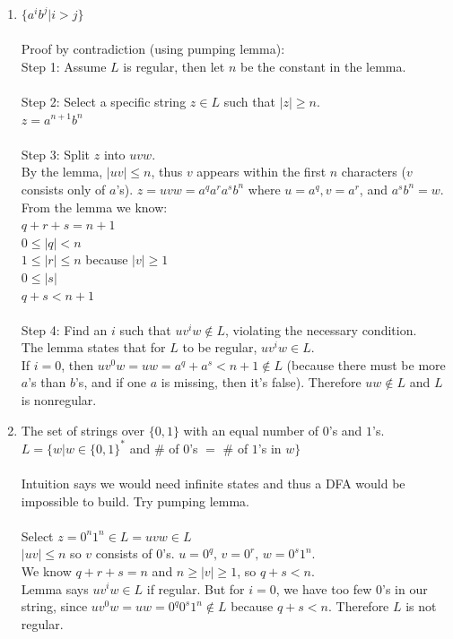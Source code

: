\documentclass[8pt,letterpaper,twocolumn]{article}
\begin{document}
  \begin{enumerate}
  \item $\{a^i b^j | i > j\}$\\
  \\
  Proof by contradiction (using pumping lemma):\\
  Step 1: Assume $L$ is regular, then let $n$ be the constant in the lemma.\\
  \\
  Step 2: Select a specific string $z \in L$ such that $|z| \geq n$.\\
  $z = a^{n+1} b^n$\\
  \\
  Step 3: Split $z$ into $uvw$.\\
  By the lemma, $|uv| \leq n$, thus $v$ appears within the first $n$ characters
  ($v$ consists only of $a$'s).
  $z = uvw = a^q a^r a^s b^n$ where $u = a^q, v = a^r$, and $a^s b^n = w$.\\
  From the lemma we know:\\
  $q+r+s = n+1$\\
  $0 \leq |q| < n$\\
  $1 \leq |r| \leq n$ because $|v| \geq 1$\\
  $0 \leq |s|$\\
  $q+s < n + 1$\\
  \\
  Step 4: Find an $i$ such that $uv^iw \notin L$, violating the necessary condition.\\
  The lemma states that for $L$ to be regular, $uv^iw \in L$.\\
  If $i=0$, then $uv^0w = uw = a^q + a^s < n+1 \notin L$ (because there must be more $a$'s than $b$'s,
  and if one $a$ is missing, then it's false). Therefore $uw \notin L$ and $L$ is nonregular.  
  
  \item The set of strings over $\{0,1\}$ with an equal number of $0$'s and $1$'s.\\
  $L = \{w | w \in \{0,1\}^*$ and \# of $0$'s $=$ \# of $1$'s in $w\}$\\
  \\
  Intuition says we would need infinite states and thus a DFA would be impossible to build.
  Try pumping lemma.\\
  \\
  Select $z = 0^n 1^n \in L = uvw \in L$\\
  $|uv| \leq n$ so $v$ consists of $0$'s. $u = 0^q,\,v=0^r,\,w=0^s1^n$.\\
  We know $q+r+s = n$ and $n \geq |v| \geq 1$, so $q+s < n$.\\
  Lemma says $uv^iw \in L$ if regular. But for $i=0$, we have too few $0$'s in our string, since
  $uv^0w = uw = 0^q 0^s 1^n \notin L$ because $q+s < n$. Therefore $L$ is not regular.
  

\end{enumerate}
\end{document}

